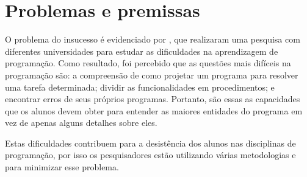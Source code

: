 \chapter{Problemas e premissas}

O problema do insucesso é evidenciado por , que realizaram uma pesquisa com diferentes universidades para estudar as dificuldades na aprendizagem de programação. Como resultado, foi percebido que as questões mais difíceis na programação são: a compreensão de como projetar um programa para resolver uma tarefa determinada; dividir as funcionalidades em procedimentos; e encontrar erros de seus próprios programas. Portanto, são essas as capacidades que os alunos devem obter para entender as maiores entidades do programa em vez de apenas alguns detalhes sobre eles.

Estas dificuldades contribuem para a desistência dos alunos nas disciplinas de programação, por isso os pesquisadores estão utilizando várias metodologias e  para minimizar esse problema.